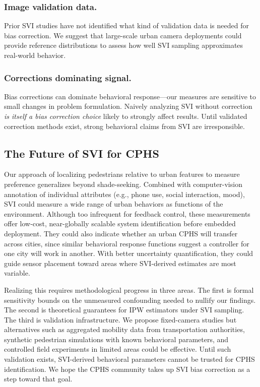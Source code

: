 \documentclass{ifacconf}
\begin{document}
  \subsubsection{Image validation data.} Prior SVI studies have
  not identified what kind of validation data is needed for bias correction.
  We suggest that large-scale urban camera deployments could provide reference
  distributions to assess how well SVI sampling approximates
  real-world behavior. 

  \subsubsection{Corrections dominating signal.} Bias corrections can
  dominate behavioral response—our measures are sensitive to small
  changes in problem formulation. Naively analyzing SVI without correction
  \textit{is itself a bias correction choice} likely to strongly affect
  results. Until validated correction methods exist, strong
  behavioral claims from SVI are irresponsible.


\subsection{The Future of SVI for CPHS}
Our approach of localizing pedestrians relative to urban features to measure preference generalizes beyond shade-seeking. Combined with computer-vision annotation of individual attributes (e.g., phone use, social interaction, mood), SVI could measure a wide range of urban behaviors as functions of the environment. Although too infrequent for feedback control, these measurements offer low-cost, near-globally scalable system identification before embedded deployment. They could also indicate whether an urban CPHS will transfer across cities, since similar behavioral response functions suggest a controller for one city will work in another. With better uncertainty quantification, they could guide sensor placement toward areas where SVI-derived estimates are most variable.

Realizing this requires methodological progress in three areas. The first is formal sensitivity bounds on the unmeasured confounding needed to nullify our findings. The second is theoretical guarantees for IPW estimators under SVI sampling. The third is validation infrastructure. We propose fixed-camera studies but alternatives such as aggregated mobility data from transportation authorities, synthetic pedestrian simulations with known behavioral parameters, and controlled field experiments in limited areas could be effective. Until such validation exists, SVI-derived behavioral parameters cannot be trusted for CPHS identification. We hope the CPHS community takes up SVI bias correction as a step toward that goal.
\end{document}
